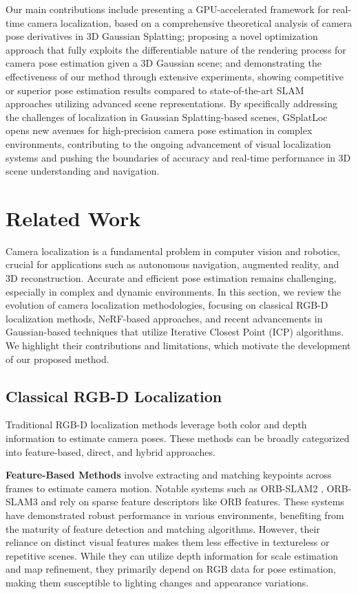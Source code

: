 \documentclass[twocolumn]{article}
\begin{document}
Our main contributions include presenting a GPU-accelerated framework
for real-time camera localization, based on a comprehensive theoretical
analysis of camera pose derivatives in 3D Gaussian Splatting; proposing
a novel optimization approach that fully exploits the differentiable
nature of the rendering process for camera pose estimation given a 3D
Gaussian scene; and demonstrating the effectiveness of our method
through extensive experiments, showing competitive or superior pose
estimation results compared to state-of-the-art SLAM approaches
utilizing advanced scene representations. By specifically addressing the
challenges of localization in Gaussian Splatting-based scenes, GSplatLoc
opens new avenues for high-precision camera pose estimation in complex
environments, contributing to the ongoing advancement of visual
localization systems and pushing the boundaries of accuracy and
real-time performance in 3D scene understanding and navigation.

\section{Related Work}\label{related-work}

Camera localization is a fundamental problem in computer vision and
robotics, crucial for applications such as autonomous navigation,
augmented reality, and 3D reconstruction. Accurate and efficient pose
estimation remains challenging, especially in complex and dynamic
environments. In this section, we review the evolution of camera
localization methodologies, focusing on classical RGB-D localization
methods, NeRF-based approaches, and recent advancements in
Gaussian-based techniques that utilize Iterative Closest Point (ICP)
algorithms. We highlight their contributions and limitations, which
motivate the development of our proposed method.

\subsection{Classical RGB-D
Localization}\label{classical-rgb-d-localization}

Traditional RGB-D localization methods leverage both color and depth
information to estimate camera poses. These methods can be broadly
categorized into feature-based, direct, and hybrid approaches.

\textbf{Feature-Based Methods} involve extracting and matching keypoints
across frames to estimate camera motion. Notable systems such as
ORB-SLAM2 \autocite{mur-artalOrbslam2OpensourceSlam2017} , ORB-SLAM3
\autocite{camposOrbslam3AccurateOpensource2021} and
\autocite{gauglitzEvaluationInterestPoint2011} rely on sparse feature
descriptors like ORB features. These systems have demonstrated robust
performance in various environments, benefiting from the maturity of
feature detection and matching algorithms. However, their reliance on
distinct visual features makes them less effective in textureless or
repetitive scenes. While they can utilize depth information for scale
estimation and map refinement, they primarily depend on RGB data for
pose estimation, making them susceptible to lighting changes and
appearance variations.
\end{document}
